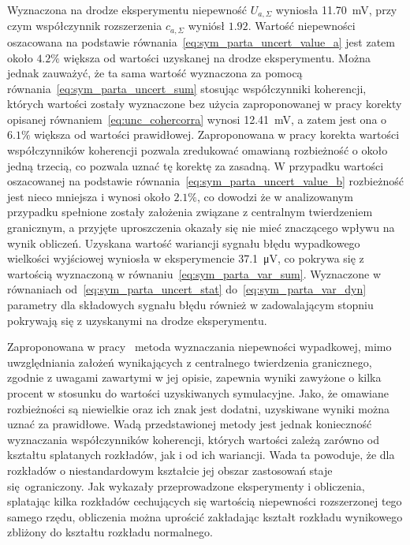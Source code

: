 Wyznaczona na drodze eksperymentu niepewność $U_{a,\Sigma}$ wyniosła \qty{11.70}{mV}, przy czym współczynnik rozszerzenia $c_{a,\Sigma}$ wyniósł $1.92$. Wartość niepewności oszacowana na podstawie równania~\eqref{eq:sym_parta_uncert_value_a} jest zatem około $4.2\%$ większa od wartości uzyskanej na drodze eksperymentu. Można jednak zauważyć, że ta sama wartość wyznaczona za pomocą równania~\eqref{eq:sym_parta_uncert_sum} stosując współczynniki koherencji, których wartości zostały wyznaczone bez użycia zaproponowanej w pracy korekty opisanej równaniem~\eqref{eq:unc_cohercorra} wynosi \qty{12.41}{mV}, a zatem jest ona o $6.1\%$ większa od wartości prawidłowej. Zaproponowana w pracy korekta wartości współczynników koherencji pozwala zredukować omawianą rozbieżność o około jedną trzecią, co pozwala uznać tę korektę za zasadną. W przypadku wartości oszacowanej na podstawie równania~\eqref{eq:sym_parta_uncert_value_b} rozbieżność jest nieco mniejsza i wynosi około $2.1\%$, co dowodzi że w analizowanym przypadku spełnione zostały założenia związane z centralnym twierdzeniem granicznym, a przyjęte uproszczenia okazały się nie mieć znaczącego wpływu na wynik obliczeń. Uzyskana wartość wariancji sygnału błędu wypadkowego wielkości wyjściowej wyniosła w eksperymencie \qty{37.1}{\micro V}, co pokrywa się z wartością wyznaczoną w równaniu~\eqref{eq:sym_parta_var_sum}. Wyznaczone w równaniach od~\eqref{eq:sym_parta_uncert_stat} do~\eqref{eq:sym_parta_var_dyn} parametry dla składowych sygnału błędu również w zadowalającym stopniu pokrywają się z uzyskanymi na drodze eksperymentu.

Zaproponowana w pracy~\cite{jakubiec_system} metoda wyznaczania niepewności wypadkowej, mimo uwzględniania założeń wynikających z centralnego twierdzenia granicznego, zgodnie z uwagami zawartymi w jej opisie, zapewnia wyniki zawyżone o kilka procent w stosunku do wartości uzyskiwanych symulacyjne. Jako, że omawiane rozbieżności są niewielkie oraz ich znak jest dodatni, uzyskiwane wyniki można uznać za prawidłowe. Wadą przedstawionej metody jest jednak konieczność wyznaczania współczynników koherencji, których wartości zależą zarówno od kształtu splatanych rozkładów, jak i od ich wariancji. Wada ta powoduje, że dla rozkładów o niestandardowym kształcie jej obszar zastosowań staje się ograniczony. Jak wykazały przeprowadzone eksperymenty i obliczenia, splatając kilka rozkładów cechujących się wartością niepewności rozszerzonej tego samego rzędu, obliczenia można uprościć zakładając kształt rozkładu wynikowego zbliżony do kształtu rozkładu normalnego.

